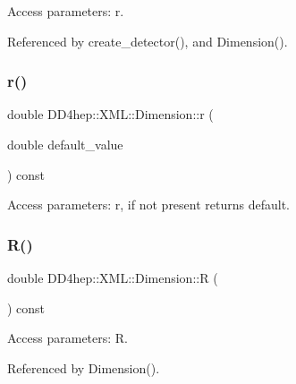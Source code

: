 Access parameters\+: r. 



Referenced by create\+\_\+detector(), and Dimension().

\hypertarget{struct_d_d4hep_1_1_x_m_l_1_1_dimension_a47baaee7e4c15170a176d3c12d571fea}{}\label{struct_d_d4hep_1_1_x_m_l_1_1_dimension_a47baaee7e4c15170a176d3c12d571fea} 
\subsubsection{\texorpdfstring{r()}{r()}\hspace{0.1cm}{\footnotesize\ttfamily [2/2]}}
{\footnotesize\ttfamily double D\+D4hep\+::\+X\+M\+L\+::\+Dimension\+::r (\begin{DoxyParamCaption}\item[{double}]{default\+\_\+value }\end{DoxyParamCaption}) const}



Access parameters\+: r, if not present returns default. 

\hypertarget{struct_d_d4hep_1_1_x_m_l_1_1_dimension_afab3533801f3146dfe0ea6285375a980}{}\label{struct_d_d4hep_1_1_x_m_l_1_1_dimension_afab3533801f3146dfe0ea6285375a980} 
\subsubsection{\texorpdfstring{R()}{R()}\hspace{0.1cm}{\footnotesize\ttfamily [1/2]}}
{\footnotesize\ttfamily double D\+D4hep\+::\+X\+M\+L\+::\+Dimension\+::R (\begin{DoxyParamCaption}{ }\end{DoxyParamCaption}) const}



Access parameters\+: R. 



Referenced by Dimension().

\hypertarget{struct_d_d4hep_1_1_x_m_l_1_1_dimension_aa247fd71861b8a3cde7f313abd8f2f5d}{}\label{struct_d_d4hep_1_1_x_m_l_1_1_dimension_aa247fd71861b8a3cde7f313abd8f2f5d} 
